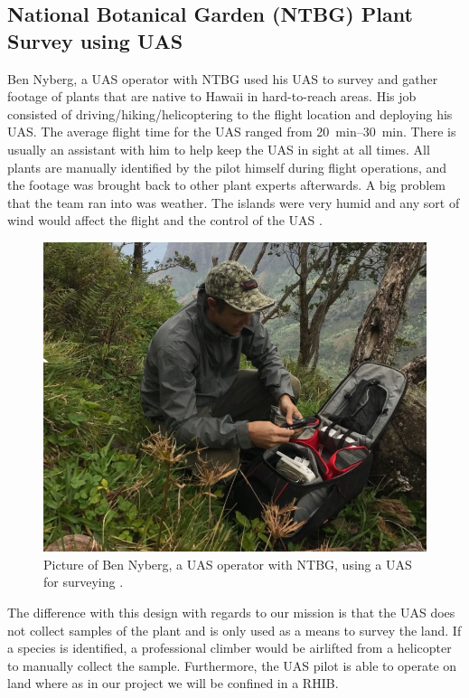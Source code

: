 \documentclass{wrcecapstone}
\begin{document}
\subsection{National Botanical Garden (NTBG) Plant Survey using UAS}
Ben Nyberg, a UAS operator with NTBG used his UAS to survey and gather footage of plants that are native to Hawaii in hard-to-reach areas.  His job consisted of driving/hiking/helicoptering to the flight location and deploying his UAS.  The average flight time for the UAS ranged from \SIrange{20}{30}{\minute}.  There is usually an assistant with him to help keep the UAS in sight at all times.  All plants are manually identified by the pilot himself during flight operations, and the footage was brought back to other plant experts afterwards.  A big problem that the team ran into was weather.  The islands were very humid and any sort of wind would affect the flight and the control of the UAS \cite{mongabay2019hunting}. 
\begin{figure}
\caption{Picture of Ben Nyberg, a UAS operator with NTBG, using a UAS for surveying \cite{mongabay2019hunting}.}
\label{fig:3.1}
\begin{center}
\includegraphics[width=0.8\columnwidth]{figures/fig31-nyberg.png}
\end{center}
\end{figure}

The difference with this design with regards to our mission is that the UAS does not collect samples of the plant and is only used as a means to survey the land. If a species is identified, a professional climber would be airlifted from a helicopter to manually collect the sample. Furthermore, the UAS pilot is able to operate on land where as in our project we will be confined in a RHIB. 
\end{document}
